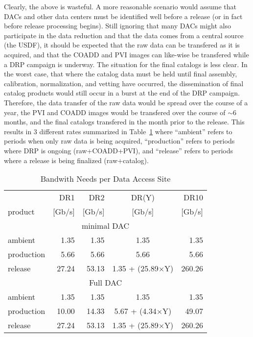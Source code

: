 Clearly, the above is wasteful.  A more reasonable scenario would assume that DACs and other data centers must be identified
well before a release (or in fact before release processing begins).  Still ignoring that many DACs might also participate 
in the data reduction and that the data comes from a central source (the USDF), it should be expected that the raw data can 
be transfered as it is acquired, and that the COADD and PVI images can like-wise be transfered while a DRP campaign is underway.
The situation for the final catalogs is less clear.  In the worst case, that where the catalog data must be held until final assembly,
calibration, normalization, and vetting have occurred, the dissemination of final catalog products would still occur in a burst at the end of the
DRP campaign.  
Therefore, the data transfer of the raw data would be spread over the course of a year, the PVI and COADD 
images would be transfered over the course of $\sim$6 months, and the final catalogs transfered in the month prior to the release.
This results in 3 different rates summarized in Table~\ref{tab_rate} where ``ambient'' refers to periods when only raw data
is being acquired, ``production'' refers to periods where DRP is ongoing (raw+COADD+PVI), and ``release'' refers to periods where 
a release is being finalized (raw+catalog).


\begin{table}[!ht]
\caption{Bandwith Needs per Data Access Site} 
\label{tab_rate}
\footnotesize
\centering
\begin{tabular}[]{|l|rrcr|}
\hline
\hline
            &   DR1   &  DR2   &  DR(Y)  &  DR10 \\
 product    &  [Gb/s] & [Gb/s] &  [Gb/s] & [Gb/s] \\
\hline
\multicolumn{5}{c}{minimal DAC} \\
\hline
 ambient    &  1.35  &  1.35  &  1.35      &  1.35  \\
 production &  5.66  &  5.66  &  5.66      &  5.66  \\
 release    & 27.24  & 53.13  &  1.35 + (25.89$\times$Y) & 260.26 \\
\hline
\multicolumn{5}{c}{Full DAC} \\
\hline
 ambient    &  1.35  &  1.35  &  1.35      &  1.35  \\
 production & 10.00  & 14.33  &  5.67 + (4.34$\times$Y) &  49.07 \\
 release    & 27.24  & 53.13  &  1.35 + (25.89$\times$Y) & 260.26 \\
\hline
\end{tabular}
\end{table}

